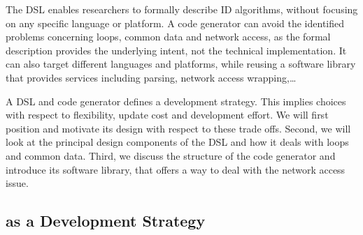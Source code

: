 \documentclass[conference]{IEEEtran}
\begin{document}
The DSL enables researchers to formally describe ID algorithms, without
focusing on any specific language or platform. A code generator can avoid the
identified problems concerning loops, common data and network access, as the
formal description provides the underlying intent, not the technical
implementation. It can also target different languages and platforms, while
reusing a software library that provides services including parsing, network
access wrapping,\dots

A DSL and code generator defines a development strategy. This implies choices
with respect to flexibility, update cost and development effort. We will first
position \NAME and motivate its design with respect to these trade offs.
Second, we will look at the principal design components of the DSL and how it
deals with loops and common data. Third, we discuss the structure of the code
generator and introduce its software library, that offers a way to deal with
the network access issue.

\subsection{\NAME as a Development Strategy}
\label{positioning}

\newcommand{\ball}[5][above,yshift=+5pt]{
\tdplottransformmainscreen{#2}{#3}{#4}
\shadedraw[tdplot_screen_coords, ball color=lightgray,draw=lightgray,shading angle=-90]
  (\tdplotresx,\tdplotresy) circle (0.20)
  node[text=gray,font=\footnotesize,#1]{#5};
}
\end{document}
